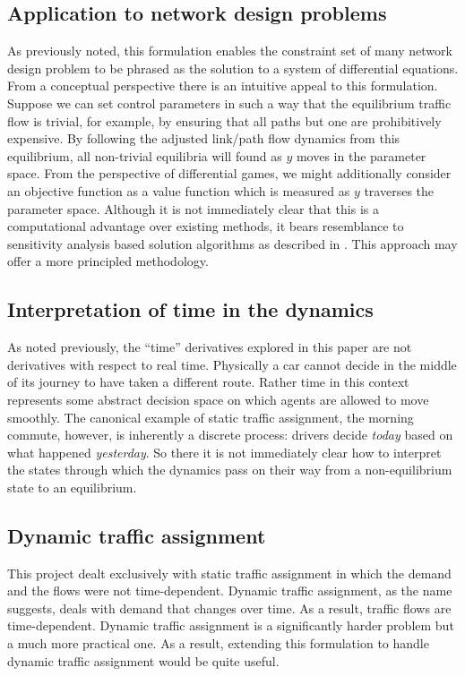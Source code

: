 \subsection{Application to network design problems}

As previously noted, this formulation enables the constraint set of many network design problem to be phrased as the solution to a system of differential equations.
From a conceptual perspective there is an intuitive appeal to this formulation.
Suppose we can set control parameters in such a way that the equilibrium traffic flow is trivial, for example, by ensuring that all paths but one are prohibitively expensive.
By following the adjusted link/path flow dynamics from this equilibrium, all non-trivial equilibria will found as $y$ moves in the parameter space.
From the perspective of differential games, we might additionally consider an objective function as a value function which is measured as $y$ traverses the parameter space.
Although it is not immediately clear that this is a computational advantage over existing methods, it bears resemblance to sensitivity analysis based solution algorithms as described in \citet{josefsson2007sensitivity}.
This approach may offer a more principled methodology.

\subsection{Interpretation of time in the dynamics}

As noted previously, the ``time'' derivatives explored in this paper are not derivatives with respect to real time.
Physically a car cannot decide in the middle of its journey to have taken a different route.
Rather time in this context represents some abstract decision space on which agents are allowed to move smoothly.
The canonical example of static traffic assignment, the morning commute, however, is inherently a discrete process: drivers decide \textit{today} based on what happened \textit{yesterday}. So there it is not immediately clear how to interpret the states through which the dynamics pass on their way from a non-equilibrium state to an equilibrium.

\subsection{Dynamic traffic assignment}

This project dealt exclusively with static traffic assignment in which the demand and the flows were not time-dependent.
Dynamic traffic assignment, as the name suggests, deals with demand that changes over time. As a result, traffic flows are time-dependent.
Dynamic traffic assignment is a significantly harder problem but a much more practical one.
As a result, extending this formulation to handle dynamic traffic assignment would be quite useful.

